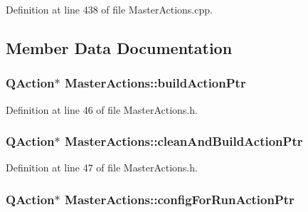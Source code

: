Definition at line 438 of file Master\-Actions.\-cpp.



\subsection{Member Data Documentation}
\hypertarget{class_master_actions_a627d91b89d122dd27addc931d1c91ca0}{
\subsubsection[{build\-Action\-Ptr}]{\setlength{\rightskip}{0pt plus 5cm}Q\-Action$\ast$ Master\-Actions\-::build\-Action\-Ptr\hspace{0.3cm}{\ttfamily [private]}}}\label{class_master_actions_a627d91b89d122dd27addc931d1c91ca0}


Definition at line 46 of file Master\-Actions.\-h.

\hypertarget{class_master_actions_a2c0f332975bec2424d4af212ab566c5a}{
\subsubsection[{clean\-And\-Build\-Action\-Ptr}]{\setlength{\rightskip}{0pt plus 5cm}Q\-Action$\ast$ Master\-Actions\-::clean\-And\-Build\-Action\-Ptr\hspace{0.3cm}{\ttfamily [private]}}}\label{class_master_actions_a2c0f332975bec2424d4af212ab566c5a}


Definition at line 47 of file Master\-Actions.\-h.

\hypertarget{class_master_actions_acd6548d1110ae426f384bfeb6acc9c1f}{
\subsubsection[{config\-For\-Run\-Action\-Ptr}]{\setlength{\rightskip}{0pt plus 5cm}Q\-Action$\ast$ Master\-Actions\-::config\-For\-Run\-Action\-Ptr\hspace{0.3cm}{\ttfamily [private]}}}\label{class_master_actions_acd6548d1110ae426f384bfeb6acc9c1f}


